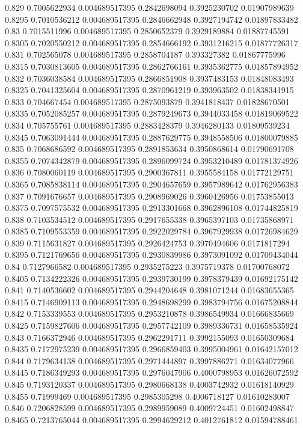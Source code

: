 {0.829 0.7005622934 0.004689517395 0.2842698094 0.3925230702 0.01907989639
0.8295 0.7010536212 0.004689517395 0.2846662948 0.3927194742 0.01897833482
0.83 0.7015511996 0.004689517395 0.2850652379 0.3929189884 0.01887745591
0.8305 0.7020550212 0.004689517395 0.2854666192 0.3931216215 0.01877726317
0.831 0.702565078 0.004689517395 0.2858704187 0.393327382 0.01867775996
0.8315 0.7030813605 0.004689517395 0.2862766161 0.3935362775 0.01857894952
0.832 0.7036038584 0.004689517395 0.2866851908 0.3937483153 0.01848083493
0.8325 0.7041325604 0.004689517395 0.2870961219 0.393963502 0.01838341915
0.833 0.704667454 0.004689517395 0.2875093879 0.3941818437 0.01828670501
0.8335 0.7052085257 0.004689517395 0.2879249673 0.3944033458 0.01819069522
0.834 0.705755761 0.004689517395 0.2883428379 0.3946280133 0.01809539234
0.8345 0.7063091444 0.004689517395 0.2887629775 0.3948558506 0.01800079885
0.835 0.7068686592 0.004689517395 0.2891853634 0.3950868614 0.01790691708
0.8355 0.7074342879 0.004689517395 0.2896099724 0.3953210489 0.01781374926
0.836 0.7080060119 0.004689517395 0.2900367811 0.3955584158 0.01772129751
0.8365 0.7085838114 0.004689517395 0.2904657659 0.3957989642 0.01762956383
0.837 0.7091676657 0.004689517395 0.2908969026 0.3960426956 0.01753855013
0.8375 0.7097575532 0.004689517395 0.2913301668 0.3962896108 0.01744825819
0.838 0.7103534512 0.004689517395 0.2917655338 0.3965397103 0.01735868971
0.8385 0.7109553359 0.004689517395 0.2922029784 0.3967929938 0.01726984629
0.839 0.7115631827 0.004689517395 0.2926424753 0.3970494606 0.0171817294
0.8395 0.7121769656 0.004689517395 0.2930839986 0.3973091092 0.01709434044
0.84 0.7127966582 0.004689517395 0.2935275223 0.3975719378 0.01700768072
0.8405 0.7134222326 0.004689517395 0.2939730199 0.3978379439 0.01692175142
0.841 0.7140536602 0.004689517395 0.2944204648 0.3981071244 0.01683655365
0.8415 0.7146909113 0.004689517395 0.2948698299 0.3983794756 0.01675208844
0.842 0.7153339553 0.004689517395 0.2953210878 0.3986549934 0.01666835669
0.8425 0.7159827606 0.004689517395 0.2957742109 0.3989336731 0.01658535924
0.843 0.7166372946 0.004689517395 0.2962291711 0.3992155093 0.01650309684
0.8435 0.7172975239 0.004689517395 0.2966859403 0.3995004961 0.01642157012
0.844 0.7179634138 0.004689517395 0.2971444897 0.3997886271 0.01634077966
0.8445 0.7186349293 0.004689517395 0.2976047906 0.4000798953 0.01626072592
0.845 0.7193120337 0.004689517395 0.2980668138 0.4003742932 0.01618140929
0.8455 0.71999469 0.004689517395 0.2985305298 0.4006718127 0.01610283007
0.846 0.7206828599 0.004689517395 0.2989959089 0.4009724451 0.01602498847
0.8465 0.7213765044 0.004689517395 0.2994629212 0.4012761812 0.01594788461
}
